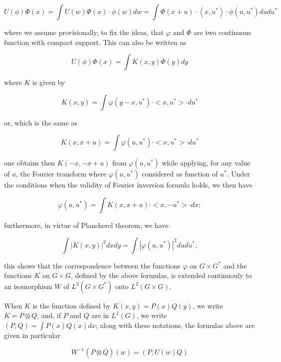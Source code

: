 \documentclass[12pt]{amsart}
\def\inn#1#2{\left\langle{#1},{#2}\right\rangle}
\begin{document}
\begin{equation}\label{eq:10}
U(\phi)\Phi(x)=\int U(w)\Phi(x)\cdot \phi(w)dw =
\int \Phi(x+u)\cdot \inn{x}{u^*} \cdot \phi(u,u^*) du du^* 
\end{equation}

where we assume provisionally, to fix the ideas, that $\varphi$ and
$\Phi$ are two continuous function with compact support. This can
also be written as

\begin{equation}\label{eq:11}
U(\phi)\Phi(x)=\int K(x,y)\Phi(y)dy
\end{equation}


where $K$ is given by

\[
K(x,y)=\int\varphi(y-x,u^{*})\cdot<x,u^{*}>\cdot du^{*}\]



or, which is the same as

\[
K(x,x+u)=\int\varphi(u,u^{*})\cdot<x,u^{*}>\cdot du^{*}\]


one obtains then $K(-x,-x+u)$ from $\varphi(u,u^{*})$ while applying,
for any value of $u$, the Fourier transform where $\varphi(u,u^{*})$
considered as function of $u^{*}$. Under the conditions when the
validity of Fourier inversion formula holds, we then have

\[
\varphi(u,u^{*})=\int K(x,x+u)\cdot<x,-u^{*}>\cdot dx;\]


furthermore, in virtue of Plancherel theorem, we have

\[
\int|K(x,y)|^{2}dxdy=\int|\varphi(u,u^{*})|^{2}dudu^{*},\]


this shows that the correspondence between the functions $\varphi$
on $G\times G^{*}$ and the functions $K$ on $G\times G$, defined
by the above formulas, is extended continuouly to an isomorphism $W$
of $L^{2}(G\times G^{*})$ onto $L^{2}(G\times G)$.

When $K$ is the function defined by $K(x,y)=P(x)Q(y)$, we write
$K=P\otimes Q$; and, if $P$ and $Q$ are in $L^{2}(G)$, we write
$(P,Q)=\int P(x)\overline{Q(x)}dx$; along with these notations, the
formulas above are given in particular

\begin{equation}\label{eq:12}
W^{-1}(P\otimes \overline{Q})(w)=(P,U(w)Q)
\end{equation}
\end{document}

